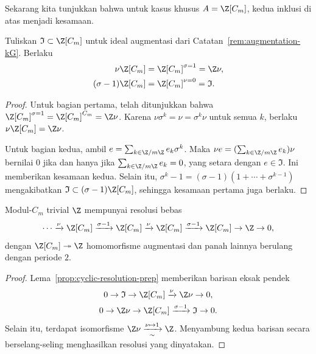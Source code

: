 Sekarang kita tunjukkan bahwa untuk kasus khusus $A=\Z[C_m]$, kedua inklusi
di atas menjadi kesamaan.

\begin{lemma}\label{prop:cyclic-resolution-prep}
	Tuliskan $\mathfrak{I}\subset\Z[C_m]$ untuk ideal augmentasi dari
	Catatan~\ref{rem:augmentation-kG}. Berlaku
	\begin{align*}
		\nu\Z[C_m]&=\Z[C_m]^{\sigma=1}=\Z\nu,\\
		(\sigma-1)\Z[C_m]&=\Z[C_m]^{\nu=0}=\mathfrak{I}.
	\end{align*}
\end{lemma}
\begin{proof}
	Untuk bagian pertama, telah ditunjukkan bahwa
	$\Z[C_m]^{\sigma=1}=\Z[C_m]^{C_m}=\Z\nu$. Karena
	$\nu\sigma^k=\nu=\sigma^k\nu$ untuk semua $k$, berlaku
	$\nu\Z[C_m]=\Z\nu$.

	Untuk bagian kedua, ambil
	$e=\sum_{k\in\Z/m\Z}e_k\sigma^k$. Maka
	$\nu e=(\sum_{k\in\Z/m\Z}e_k)\nu$ bernilai $0$ jika dan hanya jika
	$\sum_{k\in\Z/m\Z}e_k=0$, yang setara dengan $e\in\mathfrak{I}$. Ini
	memberikan kesamaan kedua. Selain itu,
	$\sigma^k-1=(\sigma-1)(1+\cdots+\sigma^{k-1})$ mengakibatkan
	$\mathfrak{I}\subset(\sigma-1)\Z[C_m]$, sehingga kesamaan pertama juga
	berlaku.
\end{proof}

\begin{lemma}\label{prop:cyclic-resolution}
	Modul-$C_m$ trivial $\Z$ mempunyai resolusi bebas
	\[ \cdots\xrightarrow{\nu}\Z[C_m]\xrightarrow{\sigma-1}\Z[C_m]
	\xrightarrow{\nu}\Z[C_m]\xrightarrow{\sigma-1}\Z[C_m]
	\to\Z\to0, \]
	dengan $\Z[C_m]\twoheadrightarrow\Z$ homomorfisme augmentasi dan panah
	lainnya berulang dengan periode $2$.
\end{lemma}
\begin{proof}
	Lema~\ref{prop:cyclic-resolution-prep} memberikan barisan eksak pendek
	\begin{gather*}
		0\to\mathfrak{I}\to\Z[C_m]\xrightarrow{\nu}\Z\nu\to0,\\
		0\to\Z\nu\to\Z[C_m]\xrightarrow{\sigma-1}\mathfrak{I}\to0.
	\end{gather*}
	Selain itu, terdapat isomorfisme
	$\Z\nu\xrightarrow[\sim]{\nu\mapsto1}\Z$. Menyambung kedua barisan secara
	berselang-seling menghasilkan resolusi yang dinyatakan.
\end{proof}

